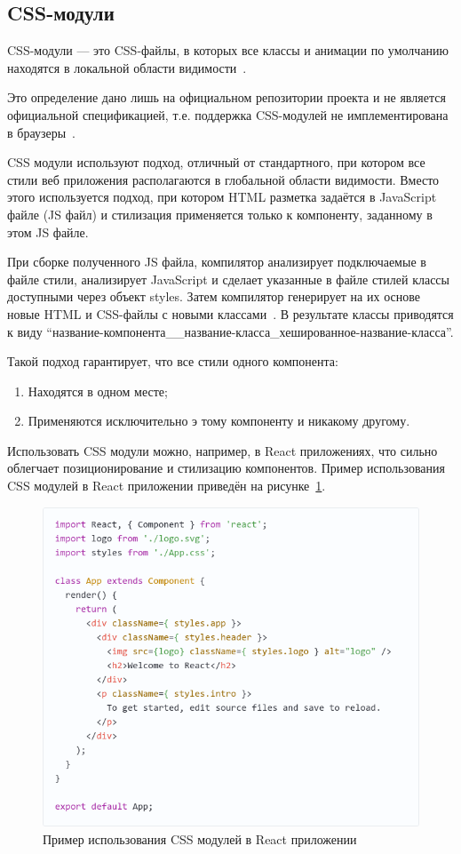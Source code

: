 \subsection{CSS-модули}

CSS-модули --- это CSS-файлы, в которых все классы и анимации по умолчанию находятся в локальной области видимости~\cite{css_modules}.

Это определение дано лишь на официальном репозитории проекта и не является официальной спецификацией, т.е. поддержка CSS-модулей не имплементирована в браузеры~\cite{frontenderMagazine}.

CSS модули используют подход, отличный от стандартного, при котором все стили веб приложения располагаются в глобальной области видимости. Вместо этого используется подход, при котором HTML разметка задаётся в JavaScript файле (JS файл) и стилизация применяется только к компоненту, заданному в этом JS файле.

При сборке полученного JS файла, компилятор анализирует подключаемые в файле стили, анализирует JavaScript и сделает указанные в файле стилей классы доступными через объект styles. Затем компилятор генерирует на их основе новые HTML и CSS-файлы с новыми классами~\cite{frontenderMagazine}. В результате классы приводятся к виду ``название-компонента\_\_название-класса\_хешированное-название-класса''.

Такой подход гарантирует, что все стили одного компонента:

\begin{enumerate}
  \item Находятся в одном месте;
  \item Применяются исключительно э тому компоненту и никакому другому.
\end{enumerate}

Использовать CSS модули можно, например, в React приложениях, что сильно облегчает позиционирование и стилизацию компонентов. Пример использования CSS модулей в React приложении приведён на рисунке~\ref{img:cssModule__react}.

\begin{figure}[H]
  \centering
  \includegraphics[height=0.4\textheight]{assets/images/theoretical2/css-module-react.png}
  \caption{Пример использования CSS модулей в React приложении}
  \label{img:cssModule__react}
\end{figure}